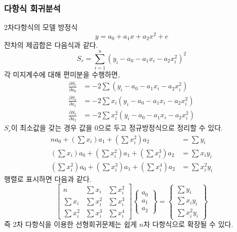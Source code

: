 \subsubsection{다항식 회귀분석}
2차다항식의 모델 방정식
\begin{equation}
y=a_{0}+a_{1}x+a_{2}x^2+e
\end{equation}
잔차의 제곱합은 다음식과 같다.
\begin{equation}
S_{r}=\sum_{i=1}^{n}\left(y_{i}-a_{0}-a_{1}x_{i}-a_{2}x_{i}^{2}\right)^{2}
\end{equation}
각 미지계수에 대해 편미분을 수행하면,
\begin{align*}
\frac{\partial S_{r}}{\partial a_{0}}&=-2\sum\left(y_{i}-a_{0}-a_{1}x_{i}-a_{2}x_{i}^{2}\right)\\
\frac{\partial S_{r}}{\partial a_{1}}&=-2\sum x_{i}\left(y_{i}-a_{0}-a_{1}x_{i}-a_{2}x_{i}^{2}\right)\\
\frac{\partial S_{r}}{\partial a_{2}}&=-2\sum x_{i}^{2}\left(y_{i}-a_{0}-a_{1}x_{i}-a_{2}x_{i}^{2}\right)
\end{align*}
$S_{r}$이 최소값을 갖는 경우 값을 0으로 두고 정규방정식으로 정리할 수 있다.
\begin{align*}
na_{0}+\left(\sum x_{i}\right)a_{1}+\left(\sum x_{i}^{2}\right)a_{2}&=\sum y_{i}\\
\left(\sum x_{i}\right)a_{0}+\left(\sum x_{i}^{2}\right)a_{1}+\left(\sum x_{i}^{3}\right)a_{2}&=\sum x_{i}y_{i}\\
\left(\sum x_{i}^{2}\right)a_{0}+\left(\sum x_{i}^{3}\right)a_{1}+\left(\sum x_{i}^{4}\right)a_{2}&=\sum x_{i}^{2}y_{i}
\end{align*}
행렬로 표시하면 다음과 같다.
\begin{equation}
\begin{bmatrix}n&\sum x_{i}&\sum x_{i}^{2}\\\sum x_{i}&\sum x_{i}^{2}&\sum x_{i}^{3}\\\sum x_{i}^{2}&\sum x_{i}^{3}&\sum x_{i}^{4}\end{bmatrix}\begin{Bmatrix}a_{0}\\a_{1}\\a_{2}\end{Bmatrix}=\begin{Bmatrix}\sum y_{i}\\\sum x_{i}y_{i}\\\sum x_{i}^{2}y_{i}\end{Bmatrix}
\end{equation}
즉 2차 다항식을 이용한 선형회귀문제는 쉽게 $n$차 다항식으로 확장될 수 있다. 
